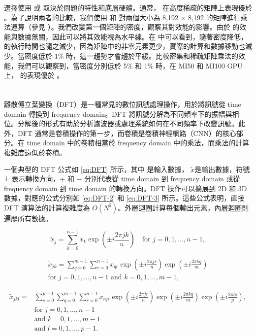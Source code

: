 選擇使用  或  取決於問題的特性和底層硬體。通常， 在高度稀疏的矩陣上表現優於 。為了說明兩者的比較，我們使用  和  對兩個大小為 8,192 × 8,192 的矩陣進行乘法運算（參見 ）。我們改變第一個矩陣的密度，觀察其對效能的影響。由於  的效能與數據無關，因此可以將其效能視為水平線。在  中可以看到，隨著密度降低， 的執行時間也隨之減少，因為矩陣中的非零元素更少，實際的計算和數據移動也減少。當密度低於 1\% 時，這一趨勢才會趨於平緩。比較密集和稀疏矩陣乘法的效能，我們可以觀察到，當密度分別低於 5\% 和 1\% 時，在 MI50 和 MI100 GPU 上， 的表現優於 。

\section{}
離散傅立葉變換（DFT）是一種常見的數位訊號處理操作，用於將訊號從 time domain 轉換到 frequency domain。DFT 將訊號分解為不同頻率下的振幅與相位。分解後的形式有助於分析濾波器或處理系統如何在不同頻率下改變訊號。此外，DFT 通常是卷積操作的第一步，而卷積是卷積神經網路（CNN）的核心部分。在 time domain 中的卷積相當於 frequency domain 中的乘法，而乘法的計算複雜度遠低於卷積。

一個典型的 DFT 公式如 \eqref{eq:DFT} 所示，其中  是輸入數據， $\tilde{x}$是輸出數據，符號 ± 表示轉換方向，+ 和 − 分別代表從 time domain 到 frequency domain 或從 frequency domain 到 time domain 的轉換方向。DFT 操作可以擴展到 2D 和 3D 數據，對應的公式分別如 \eqref{eq:DFT-2} 和 \eqref{eq:DFT-3} 所示。這些公式表明，直接 DFT 演算法的計算複雜度為 $O(N^2)$。外層迴圈計算每個輸出元素，內層迴圈則遍歷所有數據。

\begin{equation} \tag{9.5} \label{eq:DFT}
\tilde{x}_j = \sum_{k=0}^{n-1} x_k \exp\left(\pm i \frac{2\pi jk}{n}\right) \quad \text{for } j = 0, 1, \dots, n-1,
\end{equation}

\begin{align} \tag{9.6} \label{eq:DFT-2}
\tilde{x}_{jk} = \sum_{q=0}^{m-1} \sum_{r=0}^{n-1} x_{qr} 
\exp\left(\pm i \frac{2\pi jr}{n}\right) 
\exp\left(\pm i \frac{2\pi kq}{m}\right) \\
\text{for } j = 0, 1, \dots, n-1 \text{ and } k = 0, 1, \dots, m-1,
\end{align}

\begin{align} \tag{9.7} \label{eq:DFT-3}
\tilde{x}_{jkl} = &
\sum_{s=0}^{p-1} \sum_{q=0}^{m-1} \sum_{r=0}^{n-1} x_{rqs} 
\exp\left(\pm i \frac{2\pi jr}{n}\right) \exp\left(\pm i \frac{2\pi kq}{m}\right)  \exp\left(\pm i \frac{2\pi ls}{p}\right), \\
& \text{for } j = 0, 1, \dots, n-1 \\ 
& \text{and } k = 0, 1, \dots, m-1 \\ 
& \text{and } l = 0, 1, \dots, p-1.
\end{align}

